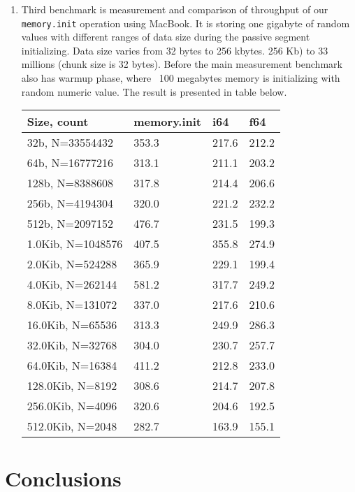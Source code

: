 \begin{enumerate}
\normalsize

\vspace{2cm}

\item Third benchmark is measurement and comparison of throughput of our \texttt{memory.init} operation using MacBook. 
      It is storing one gigabyte of random values with different ranges of data size during the passive segment initializing.  
      Data size varies from 32 bytes to 256 kbytes. 256 Kb) to 33 millions (chunk size is 32 bytes).
      Before the main measurement benchmark also has warmup phase, where ~100 megabytes memory is initializing with random numeric value.
      The result is presented in table below.
\small
\begin{table}[]
\hspace{3cm}
\begin{tabular}{|l|l|l|l|} \hline

  Size, count       & memory.init &   i64   &   f64   \\ \hline
  32b, N=33554432   &   353.3     &  217.6  &  212.2   \\ \hline
  64b, N=16777216   &   313.1     &  211.1  &  203.2   \\ \hline
  128b, N=8388608   &   317.8     &  214.4  &  206.6   \\ \hline
  256b, N=4194304   &   320.0     &  221.2  &  232.2   \\ \hline
  512b, N=2097152   &   476.7     &  231.5  &  199.3   \\ \hline
  1.0Kib, N=1048576 &   407.5     &  355.8  &  274.9   \\ \hline
  2.0Kib, N=524288  &   365.9     &  229.1  &  199.4   \\ \hline
  4.0Kib, N=262144  &   581.2     &  317.7  &  249.2   \\ \hline
  8.0Kib, N=131072  &   337.0     &  217.6  &  210.6   \\ \hline
  16.0Kib, N=65536  &   313.3     &  249.9  &  286.3   \\ \hline
  32.0Kib, N=32768  &   304.0     &  230.7  &  257.7   \\ \hline
  64.0Kib, N=16384  &   411.2     &  212.8  &  233.0   \\ \hline
  128.0Kib, N=8192  &   308.6     &  214.7  &  207.8   \\ \hline
  256.0Kib, N=4096  &   320.6     &  204.6  &  192.5   \\ \hline
  512.0Kib, N=2048  &   282.7     &  163.9  &  155.1   \\ \hline

\end{tabular}
\end{table}

\normalsize

\end{enumerate}

\section{Conclusions}

